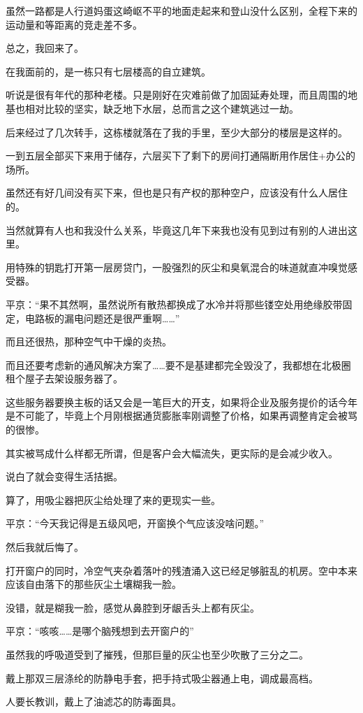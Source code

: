 虽然一路都是人行道妈蛋这崎岖不平的地面走起来和登山没什么区别，全程下来的运动量和等距离的竞走差不多。

总之，我回来了。

在我面前的，是一栋只有七层楼高的自立建筑。

听说是很有年代的那种老楼。只是刚好在灾难前做了加固延寿处理，而且周围的地基也相对比较的坚实，缺乏地下水层，总而言之这个建筑逃过一劫。

后来经过了几次转手，这栋楼就落在了我的手里，至少大部分的楼层是这样的。

一到五层全部买下来用于储存，六层买下了剩下的房间打通隔断用作居住+办公的场所。

虽然还有好几间没有买下来，但也是只有产权的那种空户，应该没有什么人居住的。

当然就算有人也和我没什么关系，毕竟这几年下来我也没有见到过有别的人进出这里。

用特殊的钥匙打开第一层房贷门，一股强烈的灰尘和臭氧混合的味道就直冲嗅觉感受器。

平京：“果不其然啊，虽然说所有散热都换成了水冷并将那些镂空处用绝缘胶带固定，电路板的漏电问题还是很严重啊……”

而且还很热，那种空气中干燥的炎热。

而且还要考虑新的通风解决方案了……要不是基建都完全毁没了，我都想在北极圈租个屋子去架设服务器了。

这些服务器要换主板的话又会是一笔巨大的开支，如果将企业及服务提价的话今年是不可能了，毕竟上个月刚根据通货膨胀率刚调整了价格，如果再调整肯定会被骂的很惨。

其实被骂成什么样都无所谓，但是客户会大幅流失，更实际的是会减少收入。

说白了就会变得生活拮据。

算了，用吸尘器把灰尘给处理了来的更现实一些。

平京：“今天我记得是五级风吧，开窗换个气应该没啥问题。”

然后我就后悔了。

打开窗户的同时，冷空气夹杂着落叶的残渣涌入这已经足够脏乱的机房。空中本来应该自由落下的那些灰尘土壤糊我一脸。

没错，就是糊我一脸，感觉从鼻腔到牙龈舌头上都有灰尘。

平京：“咳咳……是哪个脑残想到去开窗户的”

虽然我的呼吸道受到了摧残，但那巨量的灰尘也至少吹散了三分之二。

戴上那双三层涤纶的防静电手套，把手持式吸尘器通上电，调成最高档。

人要长教训，戴上了油滤芯的防毒面具。

